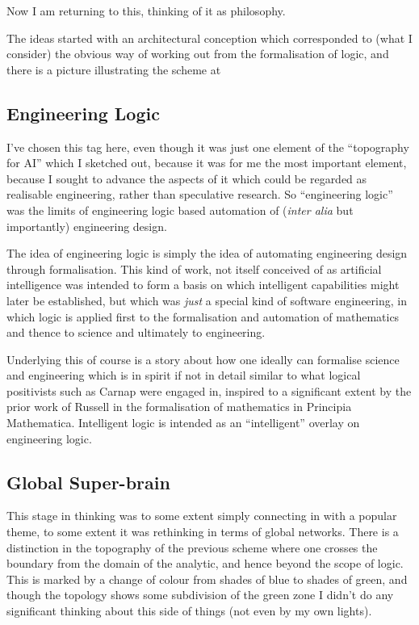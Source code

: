\documentclass[10pt,titlepage]{book}
\begin{document}
Now I am returning to this, thinking of it as philosophy.

The ideas started with an architectural conception which corresponded to (what I consider) the obvious way of working out from the formalisation of logic, and there is a picture illustrating the scheme at 

\subsection{Engineering Logic}

I've chosen this tag here, even though it was just one element of the ``topography for AI'' which I sketched out, because it was for me the most important element, because I sought to advance the aspects of it which could be regarded as realisable engineering, rather than speculative research.
So ``engineering logic'' was the limits of engineering logic based automation of ({\it inter alia} but importantly) engineering design.

The idea of engineering logic is simply the idea of automating engineering design through formalisation.
This kind of work, not itself conceived of as artificial intelligence was intended to form a basis on which intelligent capabilities might later be established, but which was {\it just} a special kind of software engineering, in which logic is applied first to the formalisation and automation of mathematics and thence to science and ultimately to engineering.

Underlying this of course is a story about how one ideally can formalise science and engineering which is in spirit if not in detail similar to what logical positivists such as Carnap were engaged in, inspired to a significant extent by the prior work of Russell in the formalisation of mathematics in Principia Mathematica.
Intelligent logic is intended as an ``intelligent'' overlay on engineering logic.

\subsection{Global Super-brain}

This stage in thinking was to some extent simply connecting in with a popular theme, to some extent it was rethinking in terms of global networks.
There is a distinction in the topography of the previous scheme where one crosses the boundary from the domain of the analytic, and hence beyond the scope of logic.
This is marked by a change of colour from shades of blue to shades of green, and though the topology shows some subdivision of the green zone I didn't do any significant thinking about this side of things (not even by my own lights).
\end{document}
